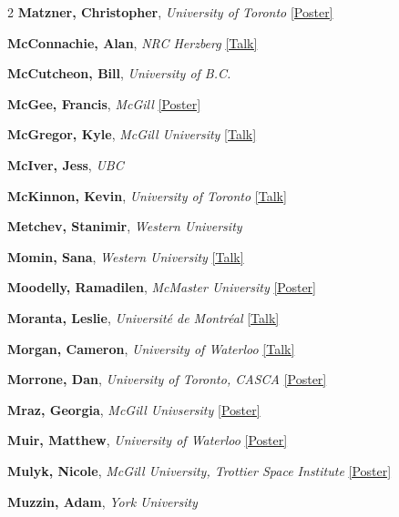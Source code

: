 \begin{small}
\begin{multicols}{2}
\textbf{Matzner, Christopher}, {\footnotesize\textit{University of Toronto}} \hyperref[poster-abstract-page-talk-192]{\scriptsize\textcolor{cascateal}{[Poster]}}\par
\textbf{McConnachie, Alan}, {\footnotesize\textit{NRC Herzberg}} \hyperref[abstract-page-talk-151]{\scriptsize\textcolor{cascablue}{[Talk]}}\par
\textbf{McCutcheon, Bill}, {\footnotesize\textit{University of B.C.}}\par
\textbf{McGee, Francis}, {\footnotesize\textit{McGill}} \hyperref[poster-abstract-page-talk-214]{\scriptsize\textcolor{cascateal}{[Poster]}}\par
\textbf{McGregor, Kyle}, {\footnotesize\textit{McGill University}} \hyperref[abstract-page-talk-227]{\scriptsize\textcolor{cascablue}{[Talk]}}\par
\textbf{McIver, Jess}, {\footnotesize\textit{UBC}}\par
\textbf{McKinnon, Kevin}, {\footnotesize\textit{University of Toronto}} \hyperref[abstract-page-talk-110]{\scriptsize\textcolor{cascablue}{[Talk]}}\par
\textbf{Metchev, Stanimir}, {\footnotesize\textit{Western University}}\par
\textbf{Momin, Sana}, {\footnotesize\textit{Western University}} \hyperref[abstract-page-talk-144]{\scriptsize\textcolor{cascablue}{[Talk]}}\par
\textbf{Moodelly, Ramadilen}, {\footnotesize\textit{McMaster University}} \hyperref[poster-abstract-page-talk-80]{\scriptsize\textcolor{cascateal}{[Poster]}}\par
\textbf{Moranta, Leslie}, {\footnotesize\textit{Université de Montréal}} \hyperref[abstract-page-talk-223]{\scriptsize\textcolor{cascablue}{[Talk]}}\par
\textbf{Morgan, Cameron}, {\footnotesize\textit{University of Waterloo}} \hyperref[abstract-page-talk-321]{\scriptsize\textcolor{cascablue}{[Talk]}}\par
\textbf{Morrone, Dan}, {\footnotesize\textit{University of Toronto, CASCA}} \hyperref[poster-abstract-page-talk-210]{\scriptsize\textcolor{cascateal}{[Poster]}}\par
\textbf{Mraz, Georgia}, {\footnotesize\textit{McGill Univsersity}} \hyperref[poster-abstract-page-talk-221]{\scriptsize\textcolor{cascateal}{[Poster]}}\par
\textbf{Muir, Matthew}, {\footnotesize\textit{University of Waterloo}} \hyperref[poster-abstract-page-talk-332]{\scriptsize\textcolor{cascateal}{[Poster]}}\par
\textbf{Mulyk, Nicole}, {\footnotesize\textit{McGill University, Trottier Space Institute}} \hyperref[poster-abstract-page-talk-201]{\scriptsize\textcolor{cascateal}{[Poster]}}\par
\textbf{Muzzin, Adam}, {\footnotesize\textit{York University}}\par


\end{multicols}
\end{small}
